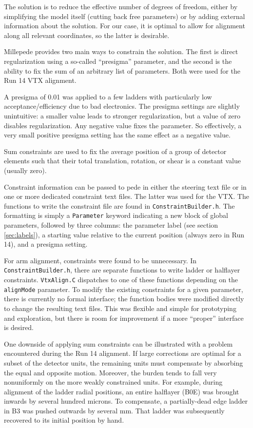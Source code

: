 \documentclass[12pt]{article}
\begin{document}
The solution is to reduce the effective number of degrees of freedom, either by simplifying the model itself (cutting back free parameters) or by adding external information about the solution. For our case, it is optimal to allow for alignment along all relevant coordinates, so the latter is desirable.

Millepede provides two main ways to constrain the solution. The first is direct regularization using a so-called ``presigma'' parameter, and the second is the ability to fix the sum of an arbitrary list of parameters. Both were used for the Run 14 VTX alignment. 

A presigma of 0.01 was applied to a few ladders with particularly low acceptance/efficiency due to bad electronics. The presigma settings are slightly unintuitive: a smaller value leads to stronger regularization, but a value of zero disables regularization. Any negative value fixes the parameter. So effectively, a very small positive presigma setting has the same effect as a negative value.

Sum constraints are used to fix the average position of a group of detector elements such that their total translation, rotation, or shear is a constant value (usually zero).

Constraint information can be passed to pede in either the steering text file or in one or more dedicated constraint text files. The latter was used for the VTX. The functions to write the constraint file are found in \texttt{ConstraintBuilder.h}. The formatting is simply a \texttt{Parameter} keyword indicating a new block of global parameters, followed by three columns: the parameter label (see section \ref{sec:labels}), a starting value relative to the current position (always zero in Run 14), and a presigma setting.

For arm alignment, constraints were found to be unnecessary. In \texttt{ConstraintBuilder.h}, there are separate functions to write ladder or halflayer constraints. \texttt{VtxAlign.C} dispatches to one of these functions depending on the \texttt{alignMode} parameter. To modify the existing constraints for a given parameter, there is currently no formal interface; the function bodies were modified directly to change the resulting text files. This was flexible and simple for prototyping and exploration, but there is room for improvement if a more ``proper'' interface is desired.

One downside of applying sum constraints can be illustrated with a problem encountered during the Run 14 alignment. If large corrections are optimal for a subset of the detector units, the remaining units must compensate by absorbing the equal and opposite motion. Moreover, the burden tends to fall very nonuniformly on the more weakly constrained units. For example, during alignment of the ladder radial positions, an entire halflayer (B0E) was brought inwards by several hundred microns. To compensate, a partially-dead edge ladder in B3 was pushed outwards by several mm. That ladder was subsequently recovered to its initial position by hand.
\end{document}
